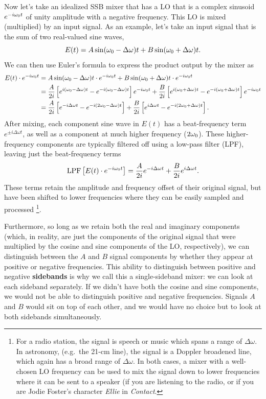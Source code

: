 \documentclass[11pt,preprint]{aastex}
\begin{document}
Now let's take an idealized SSB mixer that has a LO that
is a complex sinusoid $e^{-i\omega_0 t}$ of unity amplitude with a negative frequency.  
This LO is mixed (multiplied) by an input signal. As an example, let's take an input signal
that is the sum of two real-valued sine waves,
\begin{equation}
E(t)=A\sin (\omega_0-\Delta\omega)t + B \sin (\omega_0+\Delta\omega)t.
\end{equation}
We can then use Euler's formula to express the product output by the mixer as
\begin{align}
E(t)\cdot e^{-i\omega_0 t} &= A\sin (\omega_0-\Delta\omega)t\cdot e^{-i\omega_0 t} + B \sin (\omega_0+\Delta\omega)t \cdot e^{-i\omega_0 t}\\
&= \frac{A}{2i}\left[e^{i(\omega_0-\Delta\omega)t}-e^{-i(\omega_0-\Delta\omega)t}\right]e^{-i\omega_0 t} +
  \frac{B}{2i}\left[e^{i(\omega_0+\Delta\omega)t}-e^{-i(\omega_0+\Delta\omega)t}\right]e^{-i\omega_0 t}\\
&= \frac{A}{2i}\left[e^{-i\Delta\omega t}-e^{-i(2\omega_0-\Delta\omega)t}\right] +
  \frac{B}{2i}\left[e^{i\Delta\omega t}-e^{-i(2\omega_0+\Delta\omega)t}\right].
\end{align}
After mixing, each component sine wave in $E(t)$ has a beat-frequency term
$e^{\pm i \Delta\omega t}$, as well as a component at much higher frequency ($2\omega_0$).
These higher-frequency components are typically filtered off using a low-pass filter (LPF), leaving just the
beat-frequency terms
\begin{equation}
{\rm LPF}\left[E(t)\cdot e^{-i\omega_0 t}\right] =
  \frac{A}{2i}e^{-i\Delta\omega t} + \frac{B}{2i} e^{i\Delta\omega t}.
\end{equation}
These terms retain the amplitude and frequency offset of their original signal, but have been shifted 
to lower frequencies where they can be easily sampled and processed%
\footnote{For a radio station, the signal is
speech or music which spans a range of $\Delta\omega$. In astronomy,
(e.g.\ the 21-cm line), the signal is a Doppler broadened line, which
again has a broad range of $\Delta\omega$.  In both cases, a mixer with a well-chosen
LO frequency can be used to mix the signal down to lower frequencies where it can
be sent to a speaker (if you are listening to the radio, or if you are Jodie Foster's
character {\it Ellie} in {\it Contact}.}.

Furthermore, so long as we retain both the real and imaginary components (which,
in reality, are just the components of the original signal that were multiplied by 
the cosine and sine components of the LO, respectively), we can distinguish 
between the $A$ and $B$ signal components by whether they appear at positive or negative
frequencies.  This ability to distinguish between positive and negative {\bf sidebands}
is why we call this a single-sideband mixer: we can look at each sideband separately.
If we didn't have both the cosine and sine components, we would not be able to distinguish
positive and negative frequencies. Signals $A$ and $B$ would sit on top
of each other, and we would have no choice but to look at both sidebands simultaneously.
\end{document}
